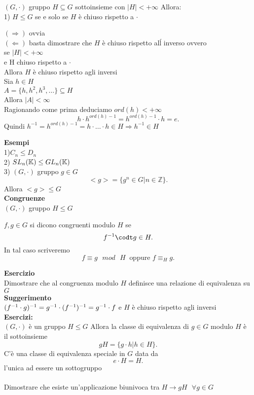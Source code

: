 \documentclass[12px]{article}
\begin{document}
 \begin{prop}
 	$(G, \cdot)$ gruppo $H\subseteq G$ sottoinsieme con  $|H| < +\infty$ Allora:\\
	1)  $H \leq G$ se e solo se  $H$ è chiuso rispetto a $\cdot$
 \end{prop}
 \begin{dimo}
 	$( \Rightarrow )$ ovvia\\
	$ ( \Leftarrow )$ basta dimostrare che $H$ è chiuso rispetto alĺ inverso ovvero\\
	se $|H| < +\infty$\\
	e  H chiuso rispetto a  $\cdot$\\
	Allora  $H$ è chiuso rispetto agli inversi\\
	Sia $h\in H$\\
	$A = \lbrace h, h^2, h^3,\ldots\rbrace\subseteq H$\\
	Allora  $|A|<\infty $\\
	Ragionando come prima deduciamo  $ord(h) < + \infty$
	 \[
		 h\cdot h^{ord(h) -1} = h^{ord(h) -1}\cdot h = e
	.\] 
	Quindi $h^{-1} = h^{ord(h)-1} = h\cdot \ldots\cdot h\in H \Rightarrow h^{-1}\in H$
 \end{dimo}
 \textbf{Esempi}\\
 1)$C_n\leq D_n$\\
 2)  $SL_n(\mathbb{K})\leq GL_n(\mathbb{K})$\\
 3) $(G, \cdot)$ gruppo $g\in G$ 
 \[
 <g> = \lbrace g^n \in G| n\in \mathbb Z\rbrace
 .\] 
 Allora  $<g>\leq G$\\
  \textbf{Congruenze}\\
  $(G,\cdot)$ gruppo $H\leq G$\\
   \begin{defi}
  	$f,g\in G$ si dicono congruenti modulo  $H$ se 
	 \[
		 f^{-1}\codt g\in H
	.\] 
	In tal caso scriveremo 
	\[
		f\equiv g \ \ \ mod \ \ \ H \ \text{ oppure } f\equiv_H g
	.\] 
  \end{defi}
  \textbf{Esercizio}\\
  Dimostrare che al congruenza modulo $H$ definisce una relazione di equivalenza su  $G$\\
  \textbf{Suggerimento}\\
  $(f^{-1}\cdot g)^{-1} = g^{-1}\cdot (f^{-1})^{-1} = g^{-1}\cdot f\\$
  e $H$ è chiuso rispetto agli inversi\\
  \textbf{Esercizi:}\\
  $(G,\cdot)$ è un gruppo $H\leq G$ Allora la classe di equivalenza di $g\in G$ modulo  $H$ è il sottoinsieme
   \[
   gH = \lbrace g\cdot h | h\in H\rbrace
  .\] 
  C'è una classe di equivalenza speciale in $G$ data da 
  \[
  e\cdot H = H
  .\] 
  l'unica ad essere un sottogruppo\\
\hline \ \\
Dimostrare che esiste un'applicazione biunivoca tra $H \rightarrow gH\ \ \ \forall g\in G$
\end{document}
